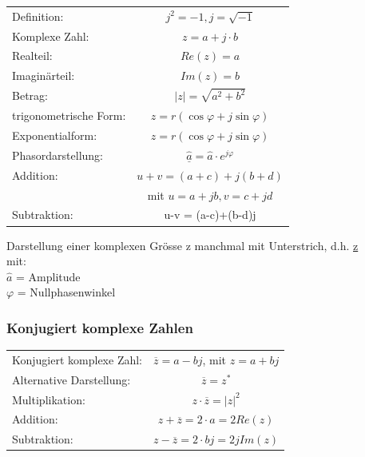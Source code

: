 \begin{sectionbox}
	\begin{emphbox}
		\begin{tabular}{lc}	
			Definition: & $ j^2 = -1, j = \sqrt{-1} $ \\
			Komplexe Zahl: & $z = a+j \cdot b $\\
			Realteil: & $Re(z) = a$ \\
			Imaginärteil: & $Im(z) = b$ \\
			Betrag: & $ \vert z \vert = \sqrt{a^2 + b^2} $ \\
			trigonometrische Form: &  $ z = r(\cos \varphi + j\sin \varphi) $ \\
			Exponentialform: &  $ z = r(\cos \varphi + j\sin \varphi) $ \\
			Phasordarstellung: & $\underline{\hat{a}} = \hat{a} \cdot e^{j\varphi}$ \\
			Addition: & $u+v = (a+c)+j(b+d)$ \\ 
			& mit $u = a+jb, v = c+jd$ \\
			Subtraktion: & u-v = (a-c)+(b-d)j \\
		\end{tabular}
	\end{emphbox}
	Darstellung einer komplexen Grösse z manchmal mit Unterstrich, d.h. \underline{z} \\
	mit: \\
	$\hat{a}$ = Amplitude \\
	$\varphi$ = Nullphasenwinkel
	
\subsubsection{Konjugiert komplexe Zahlen}
\begin{sectionbox}
	\begin{emphbox}
		\begin{tabular}{lc}
			Konjugiert komplexe Zahl: & $\overline{z} = a - bj$, mit $z = a + bj$ \\
			Alternative Darstellung: & $\overline{z} = z^\ast$ \\
			Multiplikation: & $ z \cdot \overline{z} = |z|^2 $ \\
			Addition: & $ z + \overline{z} = 2 \cdot a = 2 Re(z) $ \\
			Subtraktion: & $ z - \overline{z} = 2 \cdot bj = 2j Im(z) $
		\end{tabular}
	\end{emphbox}
\end{sectionbox}
	

\end{sectionbox}

